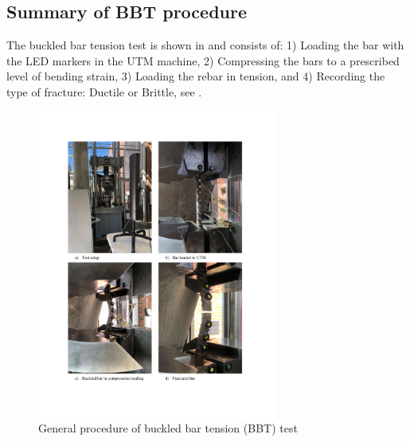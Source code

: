 \subsection{Summary of BBT procedure}

The buckled bar tension test is shown in  and consists of: 1) Loading the bar with the LED markers in the UTM machine, 2) Compressing the bars to a prescribed level of bending strain, 3) Loading the rebar in tension, and  4) Recording the type of fracture: Ductile or Brittle, see . 

\begin{figure}[htbp]
	\centering
	\includegraphics[width=0.7\textwidth]{VAC Thesis 2.0/Chapter-4/figs/BBT Procedure.pdf}
	\caption{General procedure of buckled bar tension (BBT) test}
	\label{fig:BBT_Test_Summary}
\end{figure}

